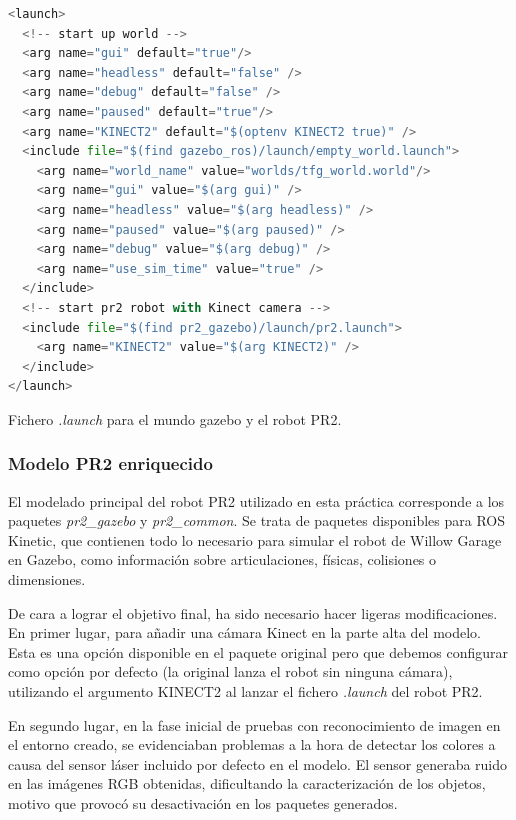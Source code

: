 \documentclass[12pt,spanish,chapterprefix, numbers=noenddot]{book}
\numberwithin{equation}{section}
\numberwithin{figure}{section}
\begin{document}
\begin{algorithm}[htb!]
\begin{lstlisting}[breaklines=true,language=python]
<launch>
  <!-- start up world -->
  <arg name="gui" default="true"/>
  <arg name="headless" default="false" />
  <arg name="debug" default="false" />
  <arg name="paused" default="true"/>
  <arg name="KINECT2" default="$(optenv KINECT2 true)" />
  <include file="$(find gazebo_ros)/launch/empty_world.launch">
    <arg name="world_name" value="worlds/tfg_world.world"/> 
    <arg name="gui" value="$(arg gui)" />
    <arg name="headless" value="$(arg headless)" />
    <arg name="paused" value="$(arg paused)" />
    <arg name="debug" value="$(arg debug)" />
    <arg name="use_sim_time" value="true" />
  </include>
  <!-- start pr2 robot with Kinect camera -->
  <include file="$(find pr2_gazebo)/launch/pr2.launch">
    <arg name="KINECT2" value="$(arg KINECT2)" />
  </include>
</launch>
\end{lstlisting}

\caption{\label{alg:tfg-launch}Fichero \textit{.launch} para el mundo gazebo y el robot PR2.}
\end{algorithm}

\subsubsection{Modelo PR2 enriquecido}
El modelado principal del robot PR2 utilizado en esta práctica corresponde a los paquetes \textit{pr2\_gazebo} y \textit{pr2\_common}. Se trata de paquetes disponibles para ROS Kinetic, que contienen todo lo necesario para simular el robot de Willow Garage en Gazebo, como  información sobre articulaciones, físicas, colisiones o dimensiones. 

De cara a lograr el objetivo final, ha sido necesario hacer ligeras modificaciones. En primer lugar, para añadir una cámara Kinect \cite{gazebo_plugins} en la parte alta del modelo. Esta es una opción disponible en el paquete original pero que debemos configurar como opción por defecto (la original lanza el robot sin ninguna cámara), utilizando el argumento KINECT2 al lanzar el fichero \textit{.launch} del robot PR2. 

En segundo lugar, en la fase inicial de pruebas con reconocimiento de imagen en el entorno creado, se evidenciaban problemas a la hora de detectar los colores a causa del sensor láser incluido por defecto en el modelo. El sensor generaba ruido en las imágenes RGB obtenidas, dificultando la caracterización de los objetos, motivo que provocó su desactivación en los paquetes generados.    
\end{document}
